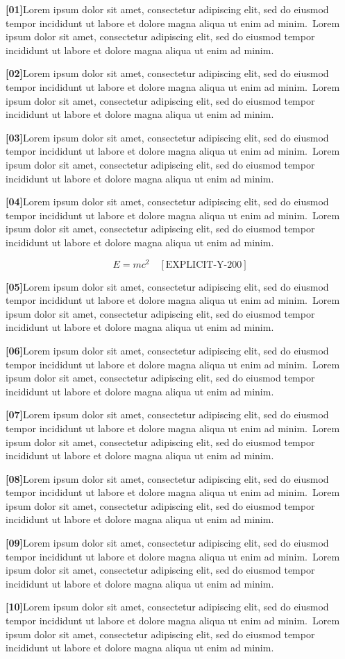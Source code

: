 \documentclass[twocolumn]{article}
\newcommand\Body{Lorem ipsum dolor sit amet, consectetur adipiscing elit, sed do
eiusmod tempor incididunt ut labore et dolore magna aliqua ut enim ad minim.}
\newcommand\Par[1]{\par\noindent\textbf{[#1]}\space\Body\ \Body\par\medskip}
\begin{document}
\Par{01}\Par{02}\Par{03}\Par{04}
\begin{wideband}[200pt]\[ E=mc^2 \quad[\text{EXPLICIT-Y-200}] \]\end{wideband}
\Par{05}\Par{06}\Par{07}\Par{08}\Par{09}\Par{10}
\end{document}
